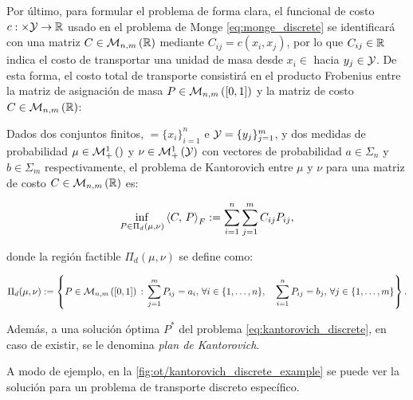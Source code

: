 Por último, para formular el problema de forma clara, el funcional de costo $c:\times\mathcal{Y}\to\mathbb{R}$ usado en el problema de Monge \eqref{eq:monge_discrete} se identificará con una matriz $C\in\mathcal{M}_{n,m}\left(\mathbb{R}\right)$ mediante $C_{ij}=c(x_i,x_j)$, por lo que $C_{ij}\in\mathbb{R}$ indica el costo de transportar una unidad de masa desde $x_i\in\xspace$ hacia $y_j\in\mathcal{Y}$. De esta forma, el costo total de transporte consistirá en el producto Frobenius entre la matriz de asignación de masa $P\in\mathcal{M}_{n,m}\left([0,1]\right)$ y la matriz de costo $C\in\mathcal{M}_{n,m}\left(\mathbb{R}\right)$:

\begin{defn}
	Dados dos conjuntos finitos, $\xspace=\{x_i\}_{i=1}^n$ e $\mathcal{Y}=\{y_j\}_{j=1}^m$, y dos medidas de probabilidad $\mu\in\mathcal{M}_+^1\left(\right)$ y $\nu\in\mathcal{M}_+^1\left(\mathcal{Y}\right)$ con vectores de probabilidad $a\in\Sigma_n$ y $b\in\Sigma_m$ respectivamente, el problema de Kantorovich entre $\mu$ y $\nu$ para una matriz de costo $C\in\mathcal{M}_{n,m}\left(\mathbb{R}\right)$ es:

	\begin{equation}
		\label{eq:kantorovich_discrete}
		\inf_{P\in \Pi_d(\mu,\nu)} \left\langle C,\,P\right\rangle_F := \sum_{i=1}^{n}\sum_{j=1}^{m} C_{ij}P_{ij} ,
	\end{equation}

	donde la región factible $\Pi_d(\mu,\nu)$ se define como:

	\begin{equation*}
		\Pi_d(\mu,\nu) := \left\{P\in\mathcal{M}_{n,m}\left([0,1]\right)\,:\,
		\sum_{j=1}^m P_{ij} = a_i,\, \forall i\in\{1,\ldots,n\},\quad
		\sum_{i=1}^n P_{ij} = b_j,\, \forall j\in\{1,\ldots,m\}
		\right\}.
	\end{equation*}

	Además, a una solución óptima $P^*$ del problema \eqref{eq:kantorovich_discrete}, en caso de existir, se le denomina \textit{plan de Kantorovich}.
\end{defn}

A modo de ejemplo, en la \autoref{fig:ot/kantorovich_discrete_example} se puede ver la solución para un problema de transporte discreto específico.

